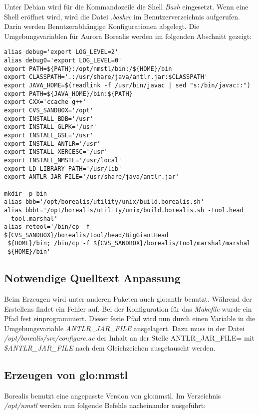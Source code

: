 Unter Debian wird für die Kommandozeile die Shell \textit{Bash} eingesetzt. Wenn eine Shell eröffnet wird, wird die Datei \textit{.bashrc} im Benutzerverzeichnis aufgerufen. Darin werden Benutzerabhängige Konfigurationen abgelegt. Die Umgebungsvariablen für Aurora Borealis werden im folgenden Abschnitt gezeigt:
\begin{verbatim}
alias debug='export LOG_LEVEL=2'
alias debug0='export LOG_LEVEL=0'
export PATH=${PATH}:/opt/nmstl/bin:/${HOME}/bin
export CLASSPATH='.:/usr/share/java/antlr.jar:$CLASSPATH'
export JAVA_HOME=$(readlink -f /usr/bin/javac | sed "s:/bin/javac::")
export PATH=${JAVA_HOME}/bin:${PATH}
export CXX='ccache g++'
export CVS_SANDBOX='/opt'
export INSTALL_BDB='/usr'
export INSTALL_GLPK='/usr'
export INSTALL_GSL='/usr'
export INSTALL_ANTLR='/usr'
export INSTALL_XERCESC='/usr'
export INSTALL_NMSTL='/usr/local'
export LD_LIBRARY_PATH='/usr/lib'
export ANTLR_JAR_FILE='/usr/share/java/antlr.jar'

mkdir -p bin
alias bbb='/opt/borealis/utility/unix/build.borealis.sh'
alias bbbt='/opt/borealis/utility/unix/build.borealis.sh -tool.head
 -tool.marshal'
alias retool='/bin/cp -f ${CVS_SANDBOX}/borealis/tool/head/BigGiantHead
 ${HOME}/bin; /bin/cp -f ${CVS_SANDBOX}/borealis/tool/marshal/marshal
 ${HOME}/bin'
\end{verbatim}


\subsection{Notwendige Quelltext Anpassung}

Beim Erzeugen wird unter anderen Paketen auch \gls{glo:antlr} benutzt. Während der Erstellens findet ein Fehler auf. Bei der Konfiguration für das \textit{Makefile} wurde ein Pfad fest einprogrammiert. Dieser feste Pfad wird nun durch einen Variable in die Umgebungsvariable \textit{ANTLR\_JAR\_FILE} ausgelagert. Dazu muss in der Datei \textit{/opt/borealis/src/configure.ac} der Inhalt an der Stelle ANTLR\_JAR\_FILE= mit \textit{\$ANTLR\_JAR\_FILE} nach dem Gleichzeichen ausgetauscht werden.


\subsection{Erzeugen von \gls{glo:nmstl}}

Borealis benutzt eine angepasste Version von \gls{glo:nmstl}. Im Verzeichnis \textit{/opt/nmstl} werden nun folgende Befehle nacheinander ausgeführt:

